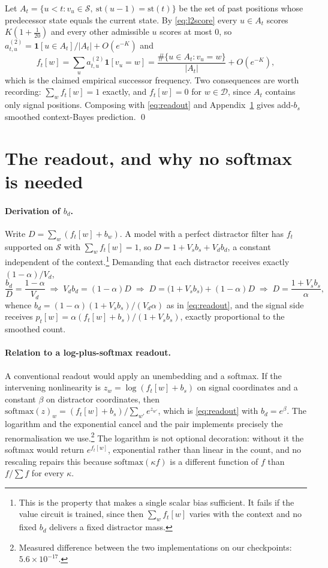 Let $A_t=\{u<t: v_u\in\mathcal{S},\ \mathrm{st}(u-1)=\mathrm{st}(t)\}$ be the set of past
positions whose predecessor state equals the current state. By \eqref{eq:l2score} every
$u\in A_t$ scores $K(1+\tfrac1{20})$ and every other admissible $u$ scores at most $0$, so
$a^{(2)}_{t,u}=\mathbf 1[u\in A_t]/|A_t|+O(e^{-K})$ and
\begin{equation}
f_t[w]=\sum_u a^{(2)}_{t,u}\mathbf 1[v_u=w]
=\frac{\#\{u\in A_t: v_u=w\}}{|A_t|}+O(e^{-K}),
\end{equation}
which is the claimed empirical successor frequency. Two consequences are worth recording:
$\sum_w f_t[w]=1$ exactly, and $f_t[w]=0$ for $w\in\mathcal{D}$, since $A_t$ contains only signal
positions. Composing with \eqref{eq:readout} and Appendix~\ref{app:readout} gives add-$b_s$
smoothed context-Bayes prediction. \qed

\section{The readout, and why no softmax is needed}
\label{app:readout}

\paragraph{Derivation of $b_d$.}
Write $D=\sum_w(f_t[w]+b_w)$. A model with a perfect distractor filter has $f_t$ supported on
$\mathcal{S}$ with $\sum_w f_t[w]=1$, so $D=1+V_sb_s+V_db_d$, a constant independent of the
context.\footnote{This is the property that makes a single scalar bias sufficient. It fails if the
value circuit is trained, since then $\sum_w f_t[w]$ varies with the context and no fixed $b_d$
delivers a fixed distractor mass.} Demanding that each distractor receives exactly
$(1-\alpha)/V_d$,
\begin{equation}
\frac{b_d}{D}=\frac{1-\alpha}{V_d}
\;\Longrightarrow\;
V_db_d=(1-\alpha)D
\;\Longrightarrow\;
D=\bigl(1+V_sb_s\bigr)+(1-\alpha)D
\;\Longrightarrow\;
D=\frac{1+V_sb_s}{\alpha},
\end{equation}
whence $b_d=(1-\alpha)(1+V_sb_s)/(V_d\alpha)$ as in \eqref{eq:readout}, and the signal side
receives $p_t[w]=\alpha(f_t[w]+b_s)/(1+V_sb_s)$, exactly proportional to the smoothed count.

\paragraph{Relation to a log-plus-softmax readout.}
A conventional readout would apply an unembedding and a softmax. If the intervening nonlinearity
is $z_w=\log(f_t[w]+b_s)$ on signal coordinates and a constant $\beta$ on distractor coordinates,
then $\mathrm{softmax}(z)_w=(f_t[w]+b_s)/\sum_{w'}e^{z_{w'}}$, which is \eqref{eq:readout} with
$b_d=e^{\beta}$. The logarithm and the exponential cancel and the pair implements precisely the
renormalisation we use.\footnote{Measured difference between the two implementations on our
checkpoints: $5.6\times10^{-17}$.} The logarithm is not optional decoration: without it the
softmax would return $e^{f_t[w]}$, exponential rather than linear in the count, and no rescaling
repairs this because $\mathrm{softmax}(\kappa f)$ is a different function of $f$ than
$f/\sum f$ for every $\kappa$.

